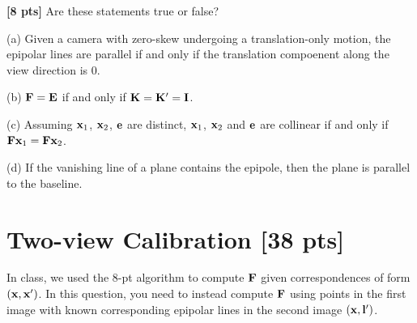 \begin{questions}
    \begin{tcolorbox}[fit,height=4.5cm, width=\textwidth, blank, borderline={0.5pt}{-2pt},halign=left, valign=center, nobeforeafter]


    \end{tcolorbox}
    \question \textbf{[8 pts]} Are these statements true or false?

    (a) Given a camera with zero-skew undergoing a translation-only motion, the epipolar lines are parallel if and only if the translation compoenent along the view direction is $0$.

    \begin{tcolorbox}[fit,height=2cm, width=\textwidth, blank, borderline={0.5pt}{-2pt},halign=left, valign=center, nobeforeafter]
    \end{tcolorbox}

    (b) $\mathbf{F} = \mathbf{E}$ if and only if $\mathbf{K} = \mathbf{K}' = \mathbf{I}$.

    \begin{tcolorbox}[fit,height=2cm, width=\textwidth, blank, borderline={0.5pt}{-2pt},halign=left, valign=center, nobeforeafter]
    \end{tcolorbox}

    (c) Assuming $\mathbf{x}_1$, $\mathbf{x}_2$, $\mathbf{e}$ are distinct, $\mathbf{x}_1$, $\mathbf{x}_2$ and $\mathbf{e}$ are collinear if and only if $\mathbf{F}\mathbf{x}_1 = \mathbf{F}\mathbf{x}_2$.

    \begin{tcolorbox}[fit,height=2cm, width=\textwidth, blank, borderline={0.5pt}{-2pt},halign=left, valign=center, nobeforeafter]
    \end{tcolorbox}

    (d) If the vanishing line of a plane contains the epipole, then the plane is parallel to the baseline.

    \begin{tcolorbox}[fit,height=2cm, width=\textwidth, blank, borderline={0.5pt}{-2pt},halign=left, valign=center, nobeforeafter]
    \end{tcolorbox}

    \clearpage

    \section{Two-view Calibration [38 pts]}
    \question In class, we used the $8$-pt algorithm to compute $\mathbf{F}$ given correspondences of form $(\mathbf{x}, \mathbf{x}')$. In this question, you need to instead compute $\mathbf{F}$ using points in the first image with known corresponding epipolar lines in the second image $(\mathbf{x}, \mathbf{l}')$.


\end{questions}
